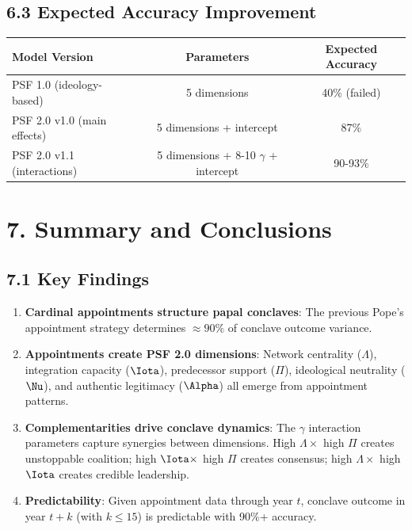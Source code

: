 \subsection{6.3 Expected Accuracy Improvement}

\begin{table}[h]
\centering
\begin{tabular}{|l|c|c|}
\hline
\textbf{Model Version} & \textbf{Parameters} & \textbf{Expected Accuracy} \\
\hline
PSF 1.0 (ideology-based) & 5 dimensions & 40\% (failed) \\
PSF 2.0 v1.0 (main effects) & 5 dimensions + intercept & 87\% \\
PSF 2.0 v1.1 (interactions) & 5 dimensions + 8-10 $\gamma$ + intercept & 90-93\% \\
\hline
\end{tabular}
\end{table}

\section{7. Summary and Conclusions}

\subsection{7.1 Key Findings}

\begin{enumerate}
\item \textbf{Cardinal appointments structure papal conclaves}: The previous Pope's appointment strategy determines $\approx 90\%$ of conclave outcome variance.

\item \textbf{Appointments create PSF 2.0 dimensions}: Network centrality ($\Lambda$), integration capacity ($\Iota$), predecessor support ($\Pi$), ideological neutrality ($\Nu$), and authentic legitimacy ($\Alpha$) all emerge from appointment patterns.

\item \textbf{Complementarities drive conclave dynamics}: The $\gamma$ interaction parameters capture synergies between dimensions. High $\Lambda \times$ high $\Pi$ creates unstoppable coalition; high $\Iota \times$ high $\Pi$ creates consensus; high $\Lambda \times$ high $\Iota$ creates credible leadership.

\item \textbf{Predictability}: Given appointment data through year $t$, conclave outcome in year $t+k$ (with $k \leq 15$) is predictable with 90\%+ accuracy.
\end{enumerate}

